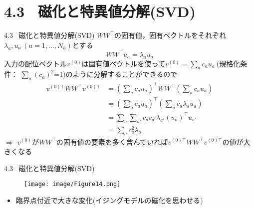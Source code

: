 \documentclass[dvipdfmx,8pt]{beamer}
\begin{document}
\section{4.3 \ 磁化と特異値分解(SVD)}
\begin{frame}[t]{4.3 \ 磁化と特異値分解(SVD)}
  $WW^{\top}$の固有値，固有ベクトルをそれぞれ$\lambda_a , u_a \ (a=1,\dots,N_h)$とする
  \begin{equation*}
    WW^{\top}u_a = \lambda_a u_a
  \end{equation*}
  入力の配位ベクトル$v^{(0)}$は固有値ベクトルを使って$v^{(0)}=\sum_{a}c_a u_a \ $(規格化条件： $\sum_{a}(c_a)^2$=1)のように分解することができるので
  \begin{align*}
    v^{(0)\top}WW^{\top}v^{(0)\top}
     & = \left(\sum_a c_a u_a\right)^{\top}WW^{\top}\left(\sum_a c_a u_a\right)  \\
     & = \left(\sum_a c_a u_a\right)^{\top}\left(\sum_a c_a \lambda_a u_a\right) \\
     & = \sum_a \sum_{a'} c_a c_{a'} \lambda_{a'} (u_a)^{\top}u_{a'}             \\
     & = \sum_a c_a^2 \lambda_a
  \end{align*}
  $\Rightarrow$ $v^{(0)}$が$WW^{\top}$の固有値の要素を多く含んでいれば$v^{(0)\top}WW^{\top}v^{(0)\top}$の値が大きくなる
\end{frame}

\begin{frame}[t]{4.3 \ 磁化と特異値分解(SVD)}
  \begin{figure}
    \begin{center}
      \texttt{[image: image/Figure14.png]}
    \end{center}
  \end{figure}
  \begin{itemize}
    \item 臨界点付近で大きな変化(イジングモデルの磁化を思わせる)
  \end{itemize}
\end{frame}
\end{document}
